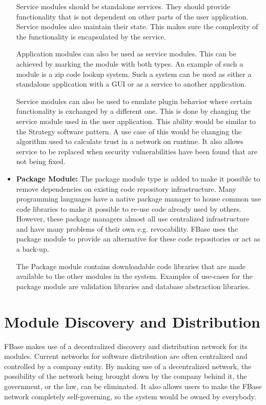 \begin{itemize}
	Service modules should be standalone services. They should provide functionality that is not dependent on other parts of the user application. Service modules also maintain their state. This makes sure the complexity of the functionality is encapsulated by the service.
	
	Application modules can also be used as service modules. This can be achieved by marking the module with both types. An example of such a module is a zip code lookup system. Such a system can be used as either a standalone application with a GUI or as a service to another application.
	
	Service modules can also be used to emulate plugin behavior where certain functionality is exchanged by a different one. This is done by changing the service module used in the user application. This ability would be similar to the Strategy software pattern. A use case of this would be changing the algorithm used to calculate trust in a network on runtime. It also allows service to be replaced when security vulnerabilities have been found that are not being fixed.
	
	\item \textbf{Package Module:}
	The package module type is added to make it possible to remove dependencies on existing code repository infrastructure. Many programming languages have a native package manager to house common use code libraries to make it possible to re-use code already used by others. However, these package managers almost all use centralized infrastructure and have many problems of their own e.g. revocability. FBase uses the package module to provide an alternative for these code repositories or act as a back-up.
	
	The Package module contains downloadable code libraries that are made available to the other modules in the system. Examples of use-cases for the package module are validation libraries and database abstraction libraries.
\end{itemize}

\section{Module Discovery and Distribution}

FBase makes use of a decentralized discovery and distribution network for its modules. Current networks for software distribution are often centralized and controlled by a company entity. By making use of a decentralized network,  the possibility of the network being brought down by the company behind it, the government, or the law, can be eliminated. It also allows users to make the FBase network completely self-governing, so the system would be owned by everybody.

